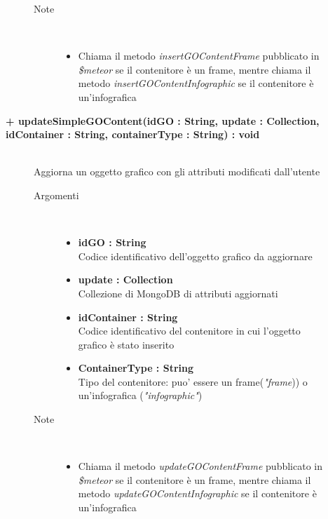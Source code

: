 \begin{description}
\begin{description}
\begin{description}
\begin{itemize}
				\end{itemize}
			\item[Note] \hfill \\
			\begin{itemize}
					\item Chiama il metodo \textit{insertGOContentFrame} pubblicato in \textit{\$meteor} se il contenitore è un frame, mentre chiama il metodo \textit{insertGOContentInfographic} se il contenitore è un'infografica
			\end{itemize}
		\end{description}
	\end{description}
	
	\begin{description}
		\item[\textbf{\color{blue}+ updateSimpleGOContent(idGO : String, update : Collection, idContainer : String, containerType : String) : void			}] \hfill \\
			Aggiorna un oggetto grafico con gli attributi modificati dall'utente
			
		\begin{description}
			\item[Argomenti] \hfill \\
				\begin{itemize}
					\item \textbf{idGO : String			} \hfill \\
					Codice identificativo dell'oggetto grafico da aggiornare
					\item \textbf{update : Collection			} \hfill \\
					Collezione di MongoDB di attributi aggiornati
					\item \textbf{idContainer : String			} \hfill \\
					Codice identificativo del contenitore in cui l'oggetto grafico è stato inserito
					\item \textbf{ContainerType : String			} \hfill \\
					Tipo del contenitore: puo' essere un frame(\textit{"frame})) o un'infografica (\textit{"infographic"})
					
				\end{itemize}
			\item[Note] \hfill \\
			\begin{itemize}
					\item Chiama il metodo \textit{updateGOContentFrame} pubblicato in \textit{\$meteor} se il contenitore è un frame, mentre chiama il metodo \textit{updateGOContentInfographic} se il contenitore è un'infografica
			\end{itemize}
		\end{description}
	\end{description}
	

\end{description}
